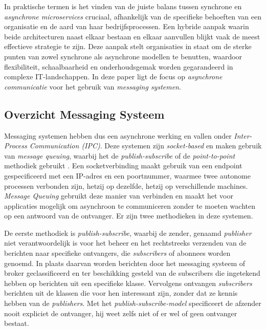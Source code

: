 In praktische termen is het vinden van de juiste balans tussen synchrone en \emph{asynchrone microservices} cruciaal, 
afhankelijk van de specifieke behoeften van een organisatie en de aard van haar bedrijfsprocessen. 
Een hybride aanpak waarin beide architecturen naast elkaar bestaan en elkaar aanvullen blijkt vaak de meest effectieve strategie te zijn. 
Deze aanpak stelt organisaties in staat om de sterke punten van zowel synchrone als asynchrone modellen te benutten, 
waardoor flexibiliteit, schaalbaarheid en onderhoudsgemak worden gegarandeerd in complexe \newline IT-landschappen.
In deze paper ligt de focus op \emph{asynchrone communicatie} voor het gebruik van \emph{messaging systemen}.
\newline

\subsection{Overzicht Messaging Systeem}
Messaging systemen hebben dus een asynchrone werking en vallen onder \newline \emph{Inter-Process Communication (IPC)}. 
Deze systemen zijn \emph{socket-based} en maken gebruik van \emph{message queuing}, waarbij het de \emph{publish-subscribe} of de \emph{point-to-point} methodiek gebruikt \autocite{Dinari2020}. 
\newline
Een socketverbinding maakt gebruik van een endpoint gespecificeerd met een IP-adres en een \newline poortnummer, 
waarmee twee autonome processen verbonden zijn, hetzij op dezelfde, hetzij op verschillende machines.
\newline
\emph{Message Queuing} gebruikt deze manier van verbinden en maakt het voor applicaties mogelijk om asynchroon 
te communiceren zonder te moeten wachten op een antwoord van de ontvanger. 
Er zijn twee methodieken in deze systemen. 
\newline

De eerste methodiek is \emph{publish-subscribe}, waarbij de zender, genaamd \emph{publisher} niet verantwoordelijk is voor het beheer 
en het rechtstreeks verzenden van de berichten naar specifieke ontvangers, die \emph{subscribers} of abonnees worden genoemd. 
In plaats daarvan worden berichten door het messaging systeem of broker geclassificeerd en ter 
beschikking gesteld van de subscribers die ingetekend hebben op berichten uit een specifieke klasse.
Vervolgens ontvangen \emph{subscribers} berichten uit de klassen die voor hen interessant zijn, zonder dat ze kennis hebben van de \emph{publishers}.
Met het \emph{publish-subscribe-model} specificeert de afzender nooit expliciet de ontvanger,
hij weet zelfs niet of er wel of geen ontvanger bestaat.
\newline

